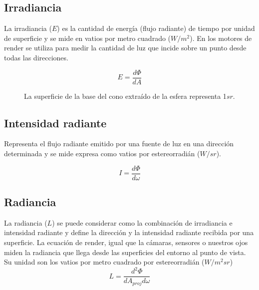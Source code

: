     \subsection*{Irradiancia}
        La irradiancia ($E$) es la cantidad de energ\'ia (flujo radiante) de tiempo por unidad de superficie y
        se mide en vatios por metro cuadrado ($W/m^2$). En los motores de render se utiliza
        para medir la cantidad de luz que incide sobre un punto desde todas las direcciones.

        \begin{equation}
            E = \dfrac{d\Phi}{dA}
        \end{equation}

        \begin{figure}[H]
            \vspace{0.5cm}
            \centering
            \caption{La superficie de la base del cono extra\'ido de la esfera representa 1$sr$.}
        \end{figure}


    \subsection*{Intensidad radiante}
        Representa el flujo radiante emitido por una fuente de luz en una direcci\'on determinada y se mide expresa
        como vatios por estereorradi\'an ($W/sr$).

        \begin{equation}
            I = \dfrac{d\Phi}{d\omega}
        \end{equation}

    \subsection*{Radiancia}
        La radiancia ($L$) se puede considerar como la combinaci\'on de irradiancia e intensidad radiante y
        define la direcci\'on y la intensidad radiante recibida por una superficie. La ecuaci\'on de render, igual que la c\'amaras,
        sensores o nuestros ojos miden la radiancia que llega desde las superficies del entorno al punto de vista. Su unidad son los
        vatios por metro cuadrado por estereorradi\'an (${W}/{m^2sr}$)
        \begin{equation}
            L = \dfrac{d^2\Phi}{dA_{proj}d\omega}
        \end{equation}

